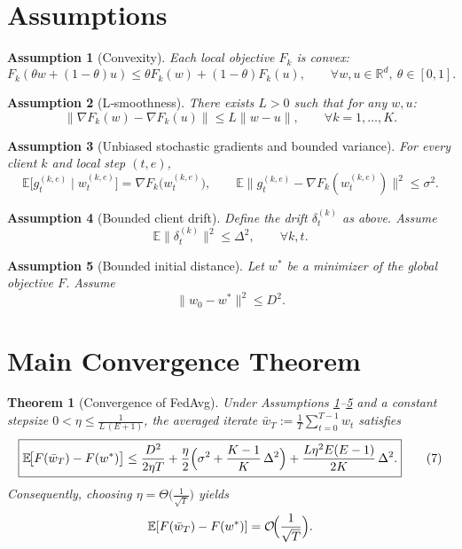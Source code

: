 \documentclass[11pt]{article}
\newtheorem{theorem}{Theorem}
\newtheorem{assumption}{Assumption}
\begin{document}
\section*{Assumptions}
\begin{assumption}[Convexity]\label{as:convex}
Each local objective \(F_k\) is convex:
\[
F_k(\theta w+(1-\theta)u)\le \theta F_k(w)+(1-\theta)F_k(u),
\qquad\forall w,u\in\mathbb{R}^d,\ \theta\in[0,1].
\]
\end{assumption}
\begin{assumption}[L‑smoothness]\label{as:smooth}
There exists \(L>0\) such that for any \(w,u\):
\[
\|\nabla F_k(w)-\nabla F_k(u)\|\le L\|w-u\|,
\qquad\forall k=1,\dots,K.
\tag{3}
\]
\end{assumption}
\begin{assumption}[Unbiased stochastic gradients and bounded variance]\label{as:unbiased}
For every client \(k\) and local step \((t,e)\),
\[
\mathbb{E}\!\bigl[g_{t}^{(k,e)}\mid w_{t}^{(k,e)}\bigr]
    =\nabla F_k\!\bigl(w_{t}^{(k,e)}\bigr),\qquad
\mathbb{E}\!\bigl\|g_{t}^{(k,e)}-\nabla F_k(w_{t}^{(k,e)})\bigr\|^{2}
    \le \sigma^{2}.
\tag{4}
\]
\end{assumption}
\begin{assumption}[Bounded client drift]\label{as:drift}
Define the drift \(\delta_t^{(k)}\) as above. Assume
\[
\mathbb{E}\bigl\|\delta_t^{(k)}\bigr\|^{2}\le \Delta^{2},
\qquad\forall k,t.
\tag{5}
\]
\end{assumption}
\begin{assumption}[Bounded initial distance]\label{as:init}
Let \(w^{*}\) be a minimizer of the global objective \(F\). Assume
\[
\|w_0-w^{*}\|^{2}\le D^{2}.
\tag{6}
\]
\end{assumption}

\section*{Main Convergence Theorem}
\begin{theorem}[Convergence of FedAvg]\label{thm:main}
Under Assumptions \ref{as:convex}–\ref{as:init} and a constant stepsize
\(0<\eta\le\frac{1}{L\,(E+1)}\), the averaged iterate
\(\bar w_T:=\frac1T\sum_{t=0}^{T-1} w_t\) satisfies
\[
\boxed{
\mathbb{E}\!\bigl[F(\bar w_T)-F(w^{*})\bigr]
   \le \frac{D^{2}}{2\eta T}
      +\frac{\eta}{2}\Bigl(\sigma^{2}
          +\frac{K-1}{K}\,\Delta^{2}\Bigr)
      +\frac{L\eta^{2}E(E-1)}{2K}\,\Delta^{2}.
}
\tag{7}
\]
Consequently, choosing \(\eta = \Theta\!\bigl(\tfrac{1}{\sqrt{T}}\bigr)\) yields
\[
\mathbb{E}[F(\bar w_T)-F(w^{*})]=\mathcal{O}\!\Bigl(\frac{1}{\sqrt{T}}\Bigr).
\]
\end{theorem}
\end{document}
